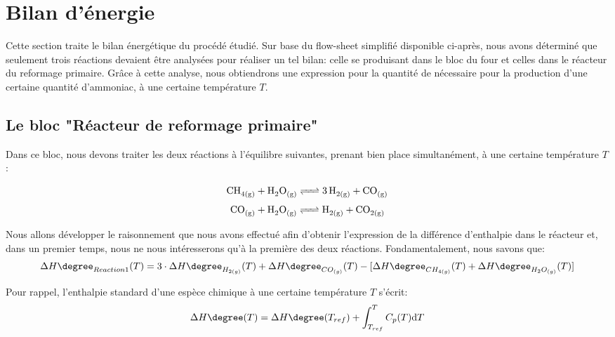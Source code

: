 
\section{Bilan d'énergie}

Cette section traite le bilan énergétique du procédé étudié.
Sur base du flow-sheet simplifié disponible ci-après, nous avons déterminé que seulement trois réactions
devaient être analysées pour réaliser un tel bilan: celle se produisant dans le bloc du four et celles dans 
le réacteur du reformage primaire. Grâce à cette analyse, nous obtiendrons une expression pour la
quantité de  nécessaire pour la production d'une certaine quantité d'ammoniac, à une certaine température $T$.

\subsection{Le bloc "Réacteur de reformage primaire"}

Dans ce bloc, nous devons traiter les deux réactions à l'équilibre suivantes, prenant
bien place simultanément, à une certaine température $T$:

\begin{equation}\label{eq:Reaction1}
\ce{CH_{4(g)} + H_{2}O_{(g)} <=> 3H_{2(g)} + CO_{(g)}}
\end{equation}
\begin{equation}\label{eq:Reaction2} {\ce{CO_{(g)} + H_{2}O_{(g)} <=>  H_{2(g)} + CO_{2(g)}}}
\end{equation}


\bigbreak
Nous allons développer le raisonnement que nous avons effectué afin d'obtenir l'expression de la différence
d'enthalpie dans le réacteur et, dans un premier temps, nous ne nous intéresserons qu'à la première des
deux réactions. Fondamentalement, nous savons que:
$$\Delta H\degree_{Reaction1}(T)=3 \cdot \Delta H\degree_{H_{2(g)}}(T) + \Delta H\degree_{CO_{(g)}}(T) -
\lbrack\Delta H\degree_{CH_{4(g)}}(T) + \Delta H\degree_{H_{2}O_{(g)}}(T)\rbrack$$

Pour rappel, l'enthalpie standard d'une espèce chimique à une certaine température $T$ s'écrit: \begin{equation}\label{eq:deltaH}
\Delta H\degree(T)=\Delta H\degree(T_{ref})  + \displaystyle \int_{T_{ref}}^{T} C_{p}(T) \mathrm{d}T
\end{equation}


